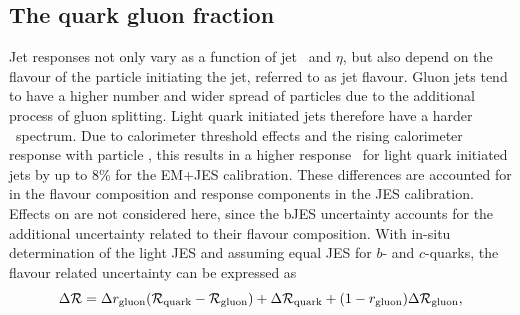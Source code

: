 \subsection{The quark gluon fraction}
\label{sect:qgf7TeV}
%
Jet responses not only vary as a function of jet \pt\ and $\eta$, but also depend on the flavour of the particle initiating the jet, referred to as jet flavour.
%
Gluon jets tend to have a higher number and wider spread of particles due to the additional process of gluon splitting. Light quark initiated jets therefore have a harder \pt\ spectrum. Due to calorimeter threshold effects and the rising calorimeter response with particle \pt, this results in a higher response \resp\ for light quark initiated jets by up to 8\% for the \gls{EM}+\gls{JES} calibration.
%
%
%
These differences are accounted for in the flavour composition and response components in the \gls{JES} calibration. 
%
Effects on  are not considered here, since the \gls{bJES} uncertainty accounts for the additional uncertainty related to their flavour composition.
%
With in-situ determination of the light \gls{JES} and assuming equal \gls{JES} for $b$- and $c$-quarks, the flavour related uncertainty can be expressed as
%
\[
\Delta \mathcal R = \Delta r_\mathrm{gluon} (\mathcal R_\mathrm{quark} - \mathcal R_\mathrm{gluon}) + \Delta \mathcal R_\mathrm{quark} + (1-r_\mathrm{gluon}) \Delta \mathcal R_\mathrm{gluon},
\]
